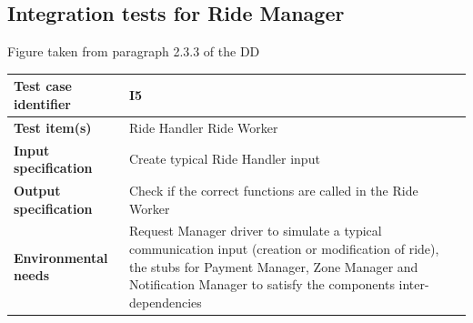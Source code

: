 \documentclass[a4paper,11pt]{report} %
\begin{document}
		\subsection{Integration tests for Ride Manager}
		\begin{minipage}{\linewidth}
		\end{minipage}
		\begin{center}
			Figure taken from paragraph 2.3.3 of the DD
		\end{center} 
		\begin{center}
			\renewcommand{\arraystretch}{1.2}
			\setlength{\tabcolsep}{24pt}
			\begin{tabular}{ l  p{9cm}}\hline
				\textbf{Test case identifier} & I5\\\hline
				\textbf{Test item(s)} & Ride Handler \textrightarrow Ride Worker\\\hline
				\textbf{Input specification} & Create typical Ride Handler input \\\hline
				\textbf{Output specification} & Check if the correct functions are called in the Ride Worker\\\hline
				\textbf{Environmental needs} & Request Manager driver to simulate a typical communication input (creation or modification of ride), the stubs for Payment Manager, Zone Manager and Notification Manager to satisfy the components inter-dependencies\\\hline
			\end{tabular}
		\end{center}	
		\bigskip	
\end{document}
